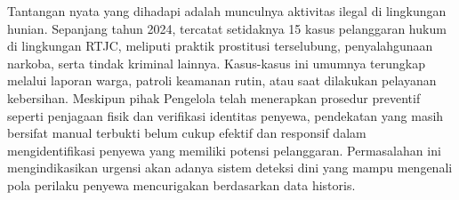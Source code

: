 Tantangan nyata yang dihadapi adalah munculnya aktivitas ilegal di lingkungan hunian. Sepanjang tahun 2024, tercatat setidaknya 15 kasus pelanggaran hukum di lingkungan RTJC, meliputi praktik prostitusi terselubung, penyalahgunaan narkoba, serta tindak kriminal lainnya. Kasus-kasus ini umumnya terungkap melalui laporan warga, patroli keamanan rutin, atau saat dilakukan pelayanan kebersihan. Meskipun pihak Pengelola telah menerapkan prosedur preventif seperti penjagaan fisik dan verifikasi identitas penyewa, pendekatan yang masih bersifat {manual} terbukti belum cukup efektif dan responsif dalam mengidentifikasi penyewa yang memiliki potensi pelanggaran. Permasalahan ini mengindikasikan urgensi akan adanya sistem deteksi dini yang mampu mengenali pola perilaku penyewa mencurigakan berdasarkan data historis. 




